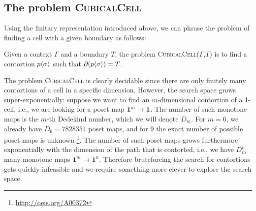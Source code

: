 \documentclass{llncs}
\newcommand{\myproblem}[1]{\textsc{{#1}}}
\newcommand{\pint}[1]{\mathbf{1}^{#1}}
\newcommand{\pintrestr}[3]{\mathbf{1}^{#1}_{{#2}={#3}}}
\newcommand{\restrict}[2]{{#1}|_{#2}}
\renewcommand{\dim}[1]{\mathsf{dim}({#1})}
\newcommand{\ctxtdim}[1]{|{#1}|}
\newcommand{\dmap}[2]{d^{({#1} , {#2})}}
\newcommand{\cont}[2]{\ensuremath{ \ifthenelse{\equal{#2}{}}{#1}{{#1}\langle{#2}\rangle}} }
\newcommand{\boundary}[1]{\partial({#1})}
\begin{document}
\begin{proposition}
\subsection{The problem \myproblem{CubicalCell}}
\label{ssec:cubicalcell}

Using the finitary representation introduced above, we can phrase the problem of
finding a cell with a given boundary as follows:

\begin{definition}
  Given a context $\Gamma$ and a boundary $T$, the problem
  \myproblem{CubicalCell}($\Gamma$,$T$) is to find a contortion $\cont{p}{\sigma}$ such that
  $\boundary{\cont{p}{\sigma}} = T$.
\end{definition}

The problem \myproblem{CubicalCell} is clearly decidable since there are
only finitely many contortions of a cell in a specific dimension. However, the
search space grows super-exponentially: suppose we want to find an
$m$-dimensional contortion of a 1-cell, i.e., we are looking for a poset map
$\pint{m} \to \pint{}$. The number of such monotone maps is the $m$-th Dedekind
number, which we will denote $D_m$. For $m = 6$, we already have $D_6 = 7828354$
poset maps, and for 9 the exact number of possible poset maps is unknown
\footnote{\url{http://oeis.org/A00372}}. The number of such poset maps grows
furthermore exponentially with the dimension of the path that is contorted,
i.e., we have $D_m^n$ many monotone maps $\pint{m} \to \pint{n}$. 
Therefore bruteforcing the search for contortions gets quickly infeasible and we
require something more clever to explore the search space.








\end{proposition}
\end{document}
